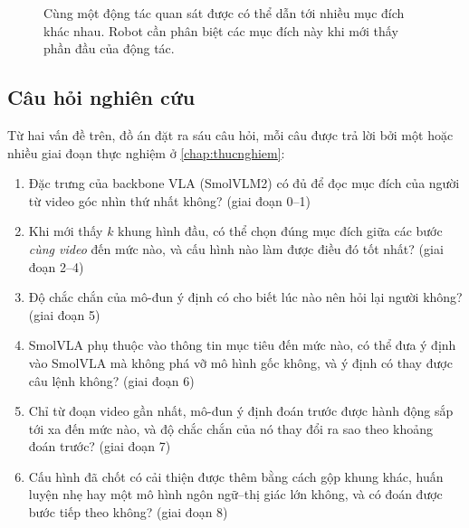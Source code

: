 \documentclass[a4paper,oneside]{report}
\begin{document}
\begin{figure}[ht]
\centering
{}
\caption{Cùng một động tác quan sát được có thể dẫn tới nhiều mục đích khác nhau. Robot cần phân biệt các mục đích này khi mới thấy phần đầu của động tác.}
\label{fig:ambiguity}
\end{figure}

\subsection{Câu hỏi nghiên cứu}

Từ hai vấn đề trên, đồ án đặt ra sáu câu hỏi, mỗi câu được trả lời bởi một hoặc nhiều giai đoạn thực nghiệm ở \cref{chap:thucnghiem}:
\begin{enumerate}
  \item[\textbf{Q1.}] Đặc trưng của backbone VLA (SmolVLM2) có đủ để đọc mục đích của người từ video góc nhìn thứ nhất không? (giai đoạn 0--1)
  \item[\textbf{Q2.}] Khi mới thấy $k$ khung hình đầu, có thể chọn đúng mục đích giữa các bước \textit{cùng video} đến mức nào, và cấu hình nào làm được điều đó tốt nhất? (giai đoạn 2--4)
  \item[\textbf{Q3.}] Độ chắc chắn của mô-đun ý định có cho biết lúc nào nên hỏi lại người không? (giai đoạn 5)
  \item[\textbf{Q4.}] SmolVLA phụ thuộc vào thông tin mục tiêu đến mức nào, có thể đưa ý định vào SmolVLA mà không phá vỡ mô hình gốc không, và ý định có thay được câu lệnh không? (giai đoạn 6)
  \item[\textbf{Q5.}] Chỉ từ đoạn video gần nhất, mô-đun ý định đoán trước được hành động sắp tới xa đến mức nào, và độ chắc chắn của nó thay đổi ra sao theo khoảng đoán trước? (giai đoạn 7)
  \item[\textbf{Q6.}] Cấu hình đã chốt có cải thiện được thêm bằng cách gộp khung khác, huấn luyện nhẹ hay một mô hình ngôn ngữ--thị giác lớn không, và có đoán được bước tiếp theo không? (giai đoạn 8)
\end{enumerate}
\end{document}
